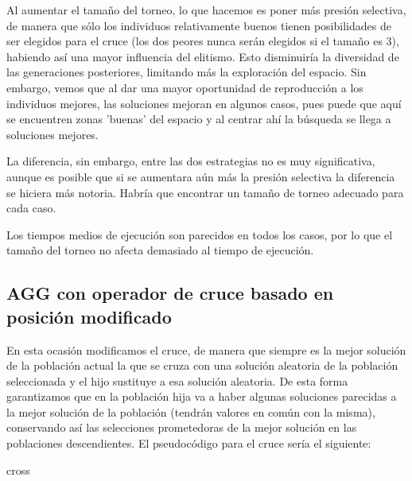 \documentclass[10pt,a4paper]{article}
\begin{document}
Al aumentar el tamaño del torneo, lo que hacemos es poner más presión selectiva, de manera que sólo los individuos relativamente buenos tienen posibilidades de ser elegidos para el cruce (los dos peores nunca serán elegidos si el tamaño es 3), habiendo así una mayor influencia del elitismo. Esto disminuiría la diversidad de las generaciones posteriores, limitando más la exploración del espacio. Sin embargo, vemos que al dar una mayor oportunidad de reproducción a los individuos mejores, las soluciones mejoran en algunos casos, pues puede que aquí se encuentren zonas 'buenas' del espacio y al centrar ahí la búsqueda se llega a soluciones mejores. 

La diferencia, sin embargo, entre las dos estrategias no es muy significativa, aunque es posible que si se aumentara aún más la presión selectiva la diferencia se hiciera más notoria. Habría que encontrar un tamaño de torneo adecuado para cada caso. 

Los tiempos medios de ejecución son parecidos en todos los casos, por lo que el tamaño del torneo no afecta demasiado al tiempo de ejecución. 
\subsection{AGG con operador de cruce basado en posición modificado}

En esta ocasión modificamos el cruce, de manera que siempre es la mejor solución de la población actual la que se cruza con una solución aleatoria de la población seleccionada y el hijo sustituye a esa solución aleatoria. De esta forma garantizamos que en la población hija va a haber algunas soluciones parecidas a la mejor solución de la población (tendrán valores en común con la misma), conservando así las selecciones prometedoras de la mejor solución en las poblaciones descendientes. El pseudocódigo para el cruce sería el siguiente: 

\begin{algorithm}[H]
	\DontPrintSemicolon
	\caption{{\sc cross} }
\end{algorithm}
\end{document}
